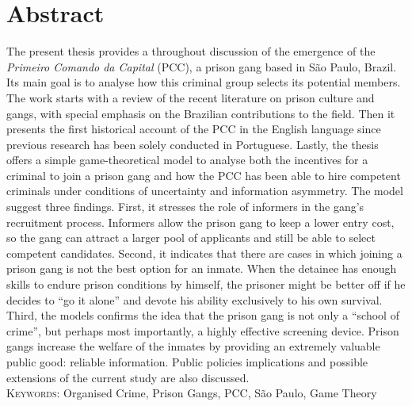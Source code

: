 

\begingroup
\let\clearpage\relax
\let\cleardoublepage\relax
\let\cleardoublepage\relax

\chapter*{Abstract} %

The present thesis provides a throughout discussion of the emergence of the \textit{Primeiro Comando da Capital} (PCC), a prison gang based in S\~{a}o Paulo, Brazil. Its main goal is to analyse how this criminal group selects its potential members. The work starts with a review of the recent literature on prison culture and gangs, with special emphasis on the Brazilian contributions to the field. Then it presents the first historical account of the PCC in the English language since previous research has been solely conducted in Portuguese. Lastly, the thesis offers a simple game-theoretical model to analyse both the incentives for a criminal to join a prison gang and how the PCC has been able to hire competent criminals under conditions of uncertainty and information asymmetry. The model suggest three findings. First, it stresses the role of informers in the gang's recruitment process. Informers allow the prison gang to keep a lower entry cost, so the gang can attract a larger pool of applicants and still be able to select competent candidates. Second, it indicates that 
there are cases in which joining a prison gang is not the best option for an inmate. When the detainee has enough skills to endure prison conditions by himself, the prisoner might be better off if he decides to ``go it alone'' and devote his ability exclusively to his own survival. Third, the models confirms the idea that the prison gang is not only a ``school of crime'', but perhaps most importantly, a highly effective screening device. Prison gangs increase the welfare of the inmates by providing an extremely valuable public good: reliable information. Public policies implications and possible extensions of the current study are also discussed.\\




\noindent
\textsc{Keywords:} Organised Crime, Prison Gangs, PCC, S\~{a}o Paulo, Game Theory

\endgroup			

\vfill